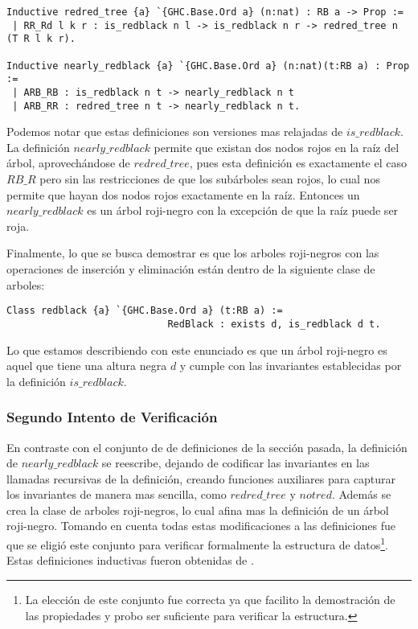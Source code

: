 \documentclass[letterpaper,12pt,oneside]{book}
\newcommand{\arn}{árbol roji-negro}
\newcommand{\arns}{arboles roji-negros}
\theoremstyle{plain}
\theoremstyle{definition}
\theoremstyle{remark}
\begin{document}
\begin{verbatim}
Inductive redred_tree {a} `{GHC.Base.Ord a} (n:nat) : RB a -> Prop :=
 | RR_Rd l k r : is_redblack n l -> is_redblack n r -> redred_tree n (T R l k r).

Inductive nearly_redblack {a} `{GHC.Base.Ord a} (n:nat)(t:RB a) : Prop :=
 | ARB_RB : is_redblack n t -> nearly_redblack n t
 | ARB_RR : redred_tree n t -> nearly_redblack n t.
\end{verbatim}

Podemos notar que estas definiciones son versiones mas relajadas de $is\_redblack$. La definici\'on 
$nearly\_redblack$ permite que existan dos nodos rojos en la ra\'iz del \'arbol, aprovech\'andose de
$redred\_tree$, pues esta definici\'on es exactamente el caso $RB\_R$ pero sin las restricciones de que 
los sub\'arboles sean rojos, lo cual nos permite que hayan dos nodos rojos exactamente en la ra\'iz. 
Entonces un $nearly\_redblack$ es un {\arn} con la excepci\'on de que la ra\'iz puede ser roja. 

Finalmente, lo que se busca demostrar es que los {\arns} con las operaciones de inserci\'on y 
eliminaci\'on están dentro de la siguiente clase de arboles:

\begin{verbatim}
Class redblack {a} `{GHC.Base.Ord a} (t:RB a) := 
                            RedBlack : exists d, is_redblack d t.
\end{verbatim}

Lo que estamos describiendo con este enunciado es que un {\arn} es aquel que tiene una altura negra $d$ y
cumple con las invariantes establecidas por la definici\'on $is\_redblack$.

\subsubsection{Segundo Intento de Verificaci\'on}
En contraste con el conjunto de de definiciones de la secci\'on pasada, la definici\'on de 
$nearly\_redblack$ se reescribe, dejando de codificar las invariantes en las llamadas recursivas de la 
definición, creando funciones auxiliares para capturar los invariantes de manera mas sencilla, como 
$redred\_tree$ y $notred$. Además se crea la clase de {\arns}, lo cual afina mas la definici\'on de un 
{\arn}. Tomando en cuenta todas estas modificaciones a las definiciones fue que se eligió este conjunto 
para verificar formalmente la estructura de datos\footnote{La elecci\'on de este conjunto fue correcta ya
que facilito la demostraci\'on de las propiedades y probo ser suficiente para verificar la estructura.}. 
Estas definiciones inductivas fueron obtenidas de \cite{MSetRBT}.
\end{document}
